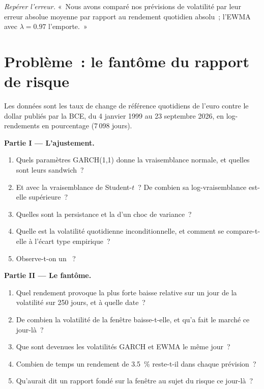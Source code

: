 \begin{exercise}[$\star\star\star$]\label{exo:qm:volatility-models:8}
\emph{Repérer l'erreur.} «~Nous avons comparé nos prévisions de volatilité par leur erreur absolue moyenne par rapport au rendement quotidien absolu~; l'EWMA avec $\lambda = 0.97$ l'emporte.~»
\end{exercise}

\section{Problème~: le fantôme du rapport de risque}

\begin{problem}\label{pb:qm:volatility-models:1}
Les données sont les taux de change de référence quotidiens de l'euro contre le dollar publiés par la BCE, du 4 janvier 1999 au 23 septembre 2026, en log-rendements en pourcentage (7\,098 jours).

\medskip\noindent\textbf{Partie I --- L'ajustement.}
\begin{enumerate}
\item Quels paramètres GARCH(1,1) donne la vraisemblance normale, et quelles sont leurs  sandwich~?
\item Et avec la vraisemblance de Student-$t$~? De combien sa log-vraisemblance est-elle supérieure~?
\item Quelles sont la persistance et la  d'un choc de variance~?
\item Quelle est la volatilité quotidienne inconditionnelle, et comment se compare-t-elle à l'écart type empirique~?
\item Observe-t-on un ~?
\end{enumerate}

\medskip\noindent\textbf{Partie II --- Le fantôme.}
\begin{enumerate}[resume]
\item Quel rendement provoque la plus forte baisse relative sur un jour de la volatilité sur 250 jours, et à quelle date~?
\item De combien la volatilité de la fenêtre baisse-t-elle, et qu'a fait le marché ce jour-là~?
\item Que sont devenues les volatilités GARCH et EWMA le même jour~?
\item Combien de temps un rendement de 3.5~\% reste-t-il dans chaque prévision~?
\item Qu'aurait dit un rapport fondé sur la fenêtre au sujet du risque ce jour-là~?
\end{enumerate}


\end{problem}
